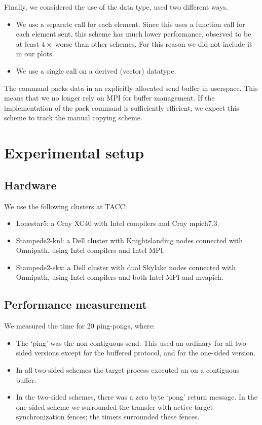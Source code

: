 Finally, we considered the use of the  data type, used
two different ways.
\begin{itemize}
\item We use a separate  call for each element. Since this
  uses a function call for each element sent, this scheme has much
  lower performance, observed to be
  at least $4\times$ worse than other schemes.
  For this reason  we did not include it in our plots.
\item We use a single  call on a derived (vector) datatype.
\end{itemize}

The  command packs data in an explicitly allocated
send buffer in userspace. This means that we no longer rely on MPI for
buffer management. If the implementation of the pack command is
sufficiently efficient, we expect this scheme to track the manual
copying scheme.

\section{Experimental setup}
\label{sec:setup}

\subsection{Hardware}

We use the following clusters at TACC:
\begin{itemize}
\item Lonestar5: a Cray XC40 with Intel compilers and Cray mpich7.3.
\item Stampede2-knl: a Dell cluster with Knightslanding nodes
  connected with Omnipath, using Intel compilers and Intel MPI.
\item Stampede2-skx: a Dell cluster with dual Skylake nodes connected
  with Omnipath, using Intel compilers and both Intel MPI and mvapich.
\end{itemize}

\subsection{Performance measurement}

We measured the time for 20 ping-pongs, where:
\begin{itemize}
\item The `ping' was the
  non-contiguous send. This used an ordinary  for all
  two-sided versions except  for the buffered protocol,
  and  for the one-sided version.
\item In all two-sided schemes the target process executed an  on a contiguous
  buffer.
\item In the two-sided schemes, there was a zero byte `pong' return
  message. In the one-sided scheme we surrounded the transfer with
  active target synchronization fences; the timers surrounded these fences.
\end{itemize}

